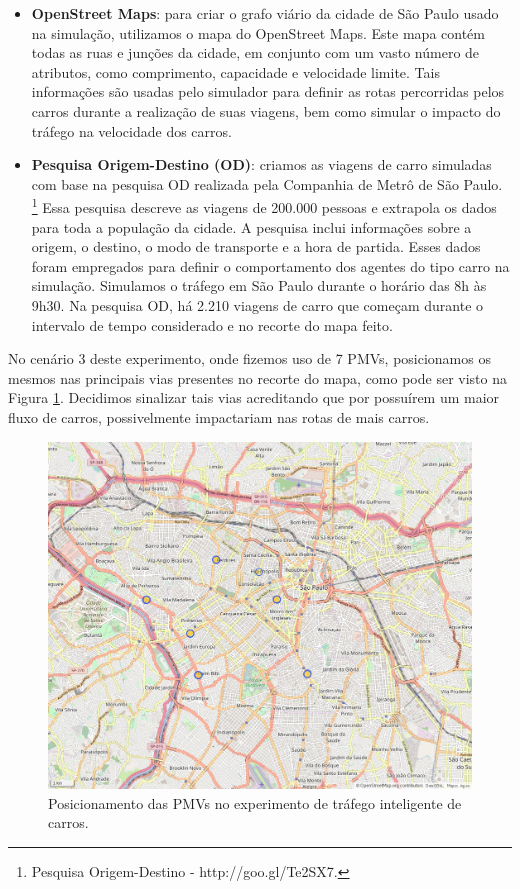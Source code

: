 \begin{itemize}
    \item \textbf{OpenStreet Maps}: para criar o grafo viário da cidade de São Paulo usado na simulação, utilizamos o mapa do OpenStreet Maps.
        Este mapa contém todas as ruas e junções da cidade, em conjunto com um vasto número de atributos, como comprimento, capacidade e velocidade limite.
        Tais informações são usadas pelo simulador para definir as rotas percorridas pelos carros durante a realização de suas viagens, bem como simular o impacto do tráfego na velocidade dos carros.

    \item \textbf{Pesquisa Origem-Destino (OD)}: criamos as viagens de carro simuladas com base na pesquisa OD realizada pela Companhia de Metrô de São Paulo.
        \footnote{Pesquisa Origem-Destino - http://goo.gl/Te2SX7.}
        Essa pesquisa descreve as viagens de 200.000 pessoas e extrapola os dados para toda a população da cidade.
        A pesquisa inclui informações sobre a origem, o destino, o modo de transporte e a hora de partida.
        Esses dados foram empregados para definir o comportamento dos agentes do tipo carro na simulação.
        Simulamos o tráfego em São Paulo durante o horário das 8h às 9h30.
        Na pesquisa OD, há 2.210 viagens de carro que começam durante o intervalo de tempo considerado e no recorte do mapa feito.
\end{itemize}

No cenário 3 deste experimento, onde fizemos uso de 7 PMVs, posicionamos os mesmos nas principais vias presentes no recorte do mapa, como pode ser visto na Figura \ref{fig:pos_pmvs}.
Decidimos sinalizar tais vias acreditando que por possuírem um maior fluxo de carros, possivelmente impactariam nas rotas de mais carros.

\begin{figure}[ht]
	\centering
	\includegraphics[width=.7\textwidth]{figuras/pmvs_locations.png}
	\caption{Posicionamento das PMVs no experimento de tráfego inteligente de carros.}
	\label{fig:pos_pmvs}
\end{figure}


